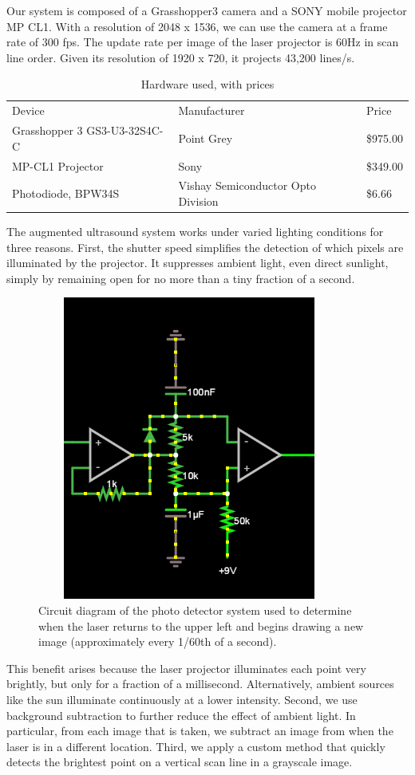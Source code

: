 \documentclass{llncs}
\begin{document}
Our system is composed of a Grasshopper3 camera and a SONY mobile projector MP CL1. With a resolution of 2048 x 1536, we can use the camera at a frame rate of 300 fps. The update rate per image of the laser projector is 60Hz in scan line order. Given its resolution of 1920 x 720, it projects 43,200 lines/s.
\begin{table}
\caption{Hardware used, with prices}
\begin{tabular}{lll}
\hline\noalign{\smallskip}
Device & Manufacturer & Price \\ \noalign{\smallskip}\hline\noalign{\smallskip} 
Grasshopper 3 GS3-U3-32S4C-C & Point Grey &  \$975.00\\ 
MP-CL1 Projector & Sony & \$349.00 \\ 
Photodiode, BPW34S & Vishay Semiconductor Opto Division & \$6.66 \\ \hline
\end{tabular}
\end{table}

The augmented ultrasound system works under varied lighting conditions for three reasons. First, the shutter speed simplifies the detection of which pixels are illuminated by the projector. It suppresses ambient light, even direct sunlight, simply by remaining open for no more than a tiny fraction of a second.

\begin{figure}
\centering
\includegraphics[width=10cm,height=10cm,keepaspectratio]{circuit}
\caption{
Circuit diagram of the photo detector system used to determine when the laser returns to the upper left and begins drawing a new image (approximately every 1/60th of a second).
}
\end{figure}
This benefit arises because the laser projector illuminates each point very brightly, but only for a fraction of a millisecond. Alternatively, ambient sources like the sun illuminate continuously at a lower intensity. Second, we use background subtraction to further reduce the effect of ambient light. In particular, from each image that is taken, we subtract an image from when the laser is in a different location.  Third, we apply a custom method that quickly detects the brightest point on a vertical scan line in a grayscale image.
\end{document}
